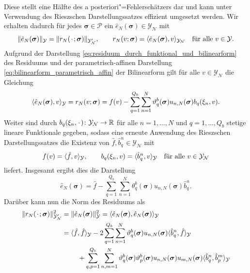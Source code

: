 \documentclass[../main.tex]{subfiles}
\begin{document}
Diese stellt eine Hälfte des a posteriori"=Fehlerschätzers dar und kann unter Verwendung des Rieszschen Darstellungssatzes effizient umgesetzt werden.
Wir erhalten dadurch für jedes $\bm \sigma \in \mathcal P$ ein $\hat{e}_{N}(\bm \sigma) \in \mathcal Y_{\mathcal N}$ mit
\begin{equation}
    \norm{\hat{e}_{N}(\bm \sigma)}_{\mathcal Y} = \norm{r_{N}(\blank; \bm \sigma)}_{\mathcal Y_{\mathcal N}'}, \qquad
    r_{N}(v; \bm \sigma) = \skp{\hat{e}_{N}(\bm \sigma)}{v}{\mathcal Y_{\mathcal N}} \quad \fa v \in \mathcal Y.
\end{equation}
Aufgrund der Darstellung \cref{eq:residuum_durch_funktional_und_bilinearform} des Residuums und der parametrisch-affinen Darstellung \cref{eq:bilinearform_parametrisch_affin} der Bilinearform gilt für alle $v \in \mathcal Y_{\mathcal N}$ die Gleichung
\begin{equation}
    \skp{\hat{e}_{N}(\bm \sigma)}{v}{\mathcal Y}
    = r_{N}(v; \bm \sigma)
    = f(v) - \sum_{q = 1}^{Q_b} \sum_{n = 1}^{N} \theta_{q}^{b}(\bm \sigma) u_{n,N}(\bm \sigma) b_{q}(\xi_{n}, v).
\end{equation}
Weiter sind durch $b_{q}(\xi_{n}, \blank) \colon \mathcal Y_{\mathcal N} \to \mathbb{R}$ für alle $n = 1, \dots, N$ und $q = 1, \dots, Q_b$ stetige lineare Funktionale gegeben, sodass eine erneute Anwendung des Rieszschen Darstellungssatzes die Existenz von $\hat{f}, \hat{b}^{n}_{q} \in \mathcal Y_{\mathcal N}$ mit
\begin{equation}
    f(v) = \skp{\hat{f}}{v}{\mathcal Y},
    \qquad
    b_{q}(\xi_{n}, v) = \skp{\hat{b}^{n}_{q}}{v}{\mathcal Y}
    \quad \fa v \in \mathcal Y_{\mathcal N}
\end{equation}
liefert.
Insgesamt ergibt dies die Darstellung
\begin{equation}
    \hat{e}_{N}(\bm \sigma) = \hat{f} - \sum_{q = 1}^{Q_b} \sum_{n = 1}^{N} \theta_{q}^{b}(\bm \sigma) u_{n,N}(\bm \sigma) \hat{b}^{n}_{q}.
\end{equation}
Darüber kann nun die Norm des Residuums als
\begin{equation}
    \begin{aligned}
        \norm{r_{N}(\blank; \bm \sigma)}_{\mathcal Y_{\mathcal N}'}^{2}
        &= \norm{\hat{e}_{N}(\bm \sigma)}_{\mathcal Y}^{2}
        = \skp{\hat{e}_{N}(\bm \sigma)}{\hat{e}_{N}(\bm \sigma)}{\mathcal Y}
        \\&= \begin{multlined}[t]
            \skp{\hat{f}}{\hat{f}}{\mathcal Y}
                - 2 \sum_{q = 1}^{Q_b} \sum_{n = 1}^{N} \theta_{q}^{b}(\bm \sigma) u_{n,N}(\bm \sigma) \skp{\hat{b}^{n}_{q}}{\hat{f}}{\mathcal Y}
                \\+ \sum_{q, p = 1}^{Q_b} \sum_{n, m = 1}^{N} \theta_{q}^{b}(\bm \sigma) \theta_{p}^{b}(\bm \sigma) u_{n,N}(\bm \sigma) u_{m,N}(\bm \sigma) \skp{\hat{b}^{n}_{q}}{\hat{b}^{m}_{p}}{\mathcal Y}
        \end{multlined}
    \end{aligned}
\end{equation}
\end{document}
